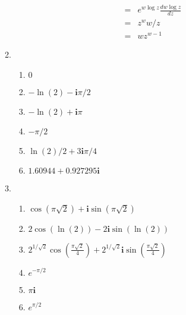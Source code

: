 \documentclass{article}%
\newcommand\I{\textbf{i}}
\begin{document}
\begin{enumerate}
\begin{enumerate}[label*=\arabic*.]
\begin{eqnarray*}
                             &=& e^{w\log{z}}\frac{d w\log{z}}{dz} \\
                             &=& z^w w/z \\
                             &=& wz^{w-1}
        \end{eqnarray*}
        \setcounter{enumii}{56}
        \item %
        \begin{enumerate}[label=(\alph*)]
            \item %
                $0$
            \item %
                $-\ln(2)-\I\pi/2$
            \item %
                $-\ln(2)+\I\pi$
            \item %
                $-\pi/2$
            \item %
                $\ln(2)/2+3\I\pi/4$
            \item %
                $ 1.60944+0.927295\I$
        \end{enumerate}
        \setcounter{enumii}{58}
        \item %
        \begin{enumerate}[label=(\alph*)]
            \item %
                $\cos(\pi \sqrt{2}) + \I \sin(\pi \sqrt{2})$
            \item %
                $2\cos(\ln(2))-2\I\sin(\ln(2))$
            \item %
                $2^{1/\sqrt{2}} \cos(\frac{\pi\sqrt2}{4}) + 2^{1/\sqrt{2}} \I\sin(\frac{\pi\sqrt2}{4})$
            \item %
                $e^{-\pi/2}$
            \item %
                $\pi \I$
            \item %
                $e^{\pi/2}$
        \end{enumerate}
    \end{enumerate}
\end{enumerate}
\end{document}
